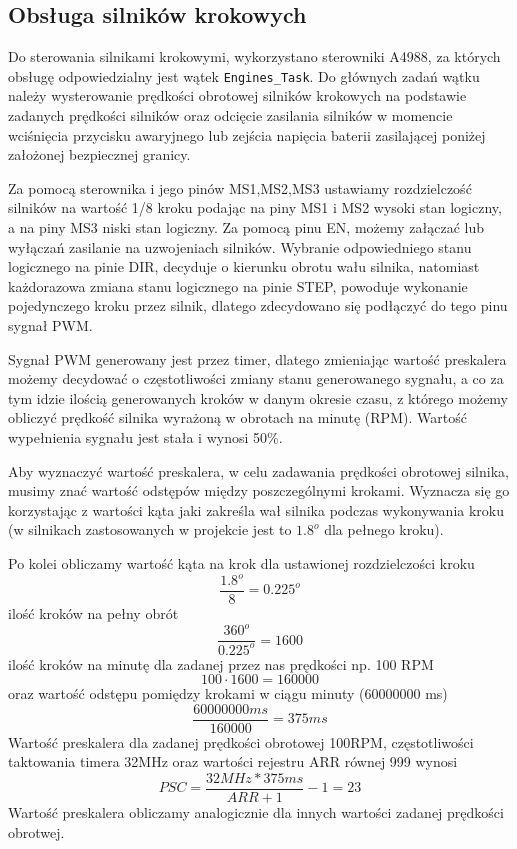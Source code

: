 \newpage
\subsection{Obsługa silników krokowych}

Do sterowania silnikami krokowymi, wykorzystano sterowniki A4988, za których obsługę odpowiedzialny jest wątek \texttt{Engines\_Task}. Do głównych zadań wątku należy wysterowanie prędkości obrotowej silników krokowych na podstawie zadanych prędkości silników oraz odcięcie zasilania silników w momencie wciśnięcia przycisku awaryjnego lub zejścia napięcia baterii zasilającej poniżej założonej bezpiecznej granicy.

Za pomocą sterownika i jego pinów MS1,MS2,MS3 ustawiamy rozdzielczość silników na wartość 1/8 kroku podając na piny MS1 i MS2 wysoki stan logiczny, a na piny MS3 niski stan logiczny. Za pomocą pinu EN, możemy załączać lub wyłączań zasilanie na uzwojeniach silników. Wybranie odpowiedniego stanu logicznego na pinie DIR, decyduje o kierunku obrotu wału silnika, natomiast każdorazowa zmiana stanu logicznego na pinie STEP, powoduje wykonanie pojedynczego kroku przez silnik, dlatego zdecydowano się podłączyć do tego pinu sygnał PWM.

Sygnał PWM generowany jest przez timer, dlatego zmieniając wartość preskalera możemy decydować o częstotliwości zmiany stanu generowanego sygnału, a co za tym idzie ilością generowanych kroków w danym okresie czasu, z którego możemy obliczyć prędkość silnika wyrażoną w obrotach na minutę (RPM). Wartość wypełnienia sygnału jest stała i wynosi 50\%. 

Aby wyznaczyć wartość preskalera, w celu zadawania prędkości obrotowej silnika, musimy znać wartość odstępów między poszczególnymi krokami. Wyznacza się go korzystając z wartości kąta jaki zakreśla wał silnika podczas wykonywania kroku (w silnikach zastosowanych w projekcie jest to $1.8^o$ dla pełnego kroku).

Po kolei obliczamy wartość kąta na krok dla ustawionej rozdzielczości kroku
$$
    \frac{1.8^o}{8} = 0.225^o
$$
ilość kroków na pełny obrót
$$
    \frac{360^o}{0.225^o} = 1600
$$
ilość kroków na minutę dla zadanej przez nas prędkości np. 100 RPM
$$
    100 \cdot 1600 = 160000
$$
oraz wartość odstępu pomiędzy krokami w ciągu minuty (60000000 ms)
$$
    \frac{60000000ms}{160000} = 375 ms
$$
Wartość preskalera dla zadanej prędkości obrotowej 100RPM, częstotliwości taktowania timera 32MHz oraz wartości rejestru ARR równej 999 wynosi
$$
    PSC = \frac{32MHz * 375ms}{ARR + 1} - 1 = 23
$$
Wartość preskalera obliczamy analogicznie dla innych wartości zadanej prędkości obrotwej.

